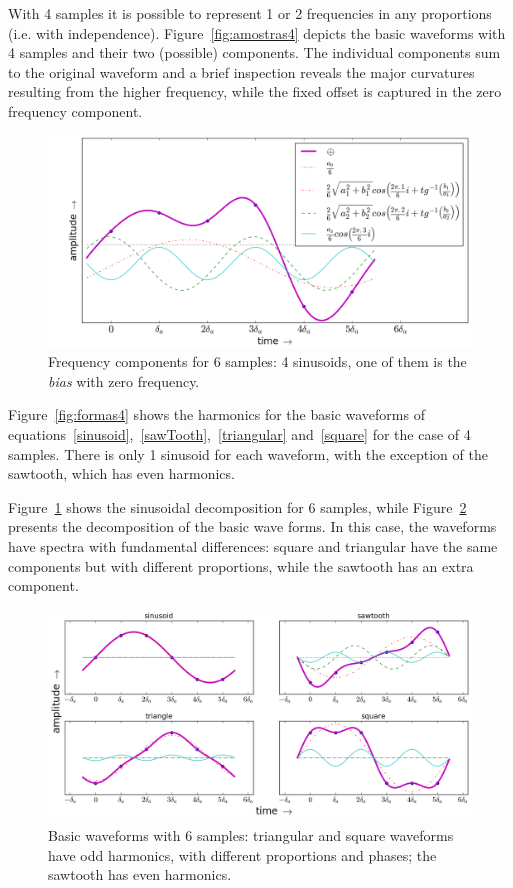 With 4 samples it is possible to represent 1 or 2 frequencies in any proportions (i.e. with independence). Figure~\ref{fig:amostras4} depicts the basic waveforms with 4 samples and their two (possible) components. The individual components sum to the original waveform and a brief inspection reveals the major curvatures resulting from the higher frequency, while the fixed offset is captured in the zero frequency component.

\begin{figure}
    \centering
        \includegraphics[width=.7\textwidth]{figures/amostras6__}
    \caption{Frequency components for 6 samples: 4 sinusoids, one of them is the \emph{bias} with zero frequency.}
        \label{fig:amostras6}
\end{figure}

Figure~\ref{fig:formas4} shows the harmonics for the basic waveforms of equations~\ref{sinusoid},~\ref{sawTooth},~\ref{triangular} and~\ref{square} for the case of 4 samples. There is only 1 sinusoid for each waveform, with the exception of the sawtooth, which has even harmonics.

Figure~\ref{fig:amostras6} shows the sinusoidal decomposition for 6 samples, while Figure~\ref{fig:formas6} presents the decomposition of the basic wave forms. In this case, the waveforms have spectra with fundamental differences: square and triangular have the same components but with different proportions, while the sawtooth has an extra component.

\begin{figure}
    \centering
        \includegraphics[width=.9\textwidth]{figures/amostras6formas___}
    \caption{Basic waveforms with 6 samples: triangular and square waveforms have odd harmonics, with different proportions and phases; the sawtooth has even harmonics.}
        \label{fig:formas6}
\end{figure}

